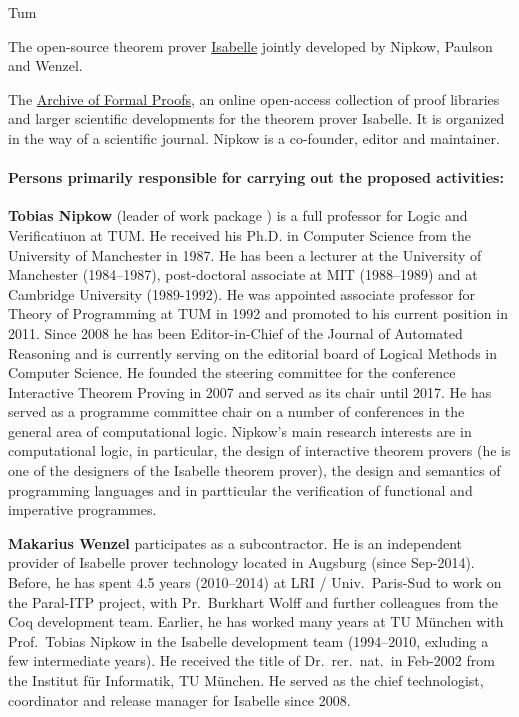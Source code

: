 \begin{sitedescription}{Tum}
\begin{compactitem}
\item The open-source theorem prover
  \href{https://isabelle.in.tum.de}{Isabelle} jointly developed by
  Nipkow, Paulson and Wenzel.
\item The \href{http://www.isa-afp.org}{Archive of Formal Proofs}, an online
open-access collection of proof libraries and larger scientific
developments for the theorem prover Isabelle. It is organized in the
way of a scientific journal.  Nipkow is a co-founder, editor and maintainer.
\end{compactitem}

\paragraph*{Persons primarily responsible for carrying out the proposed activities:}

\begin{compactitem}
\item \textbf{Tobias Nipkow} (leader of work package
) is a full professor for Logic and
Verificatiuon at TUM. He received his Ph.D. in Computer Science
from the University of Manchester in 1987.  He has been a
lecturer at the University of Manchester (1984--1987),
post-doctoral associate at MIT (1988--1989) and at Cambridge
University (1989-1992). He was appointed associate professor for Theory of Programming at
TUM in 1992 and promoted to his current position in 2011. Since 2008
he has been Editor-in-Chief of the  Journal of Automated Reasoning
and is currently serving on the editorial board of Logical Methods in
Computer Science. He founded the steering committee for the
conference Interactive Theorem Proving in 2007 and served as its
chair until 2017.
He has served as a programme committee chair
on a number of conferences in the general area of computational logic.  Nipkow's main research
interests are in computational logic, in particular, the design of
interactive theorem provers (he is one of the designers of the
Isabelle theorem prover), the design and semantics of programming
languages and in partticular the verification of functional and
imperative programmes.

\item \textbf{Makarius Wenzel} participates as a subcontractor. He is an independent provider of Isabelle
  prover technology located in Augsburg (since Sep-2014). Before, he
  has spent 4.5 years (2010--2014) at LRI / Univ.\ Paris-Sud to work on
  the Paral-ITP project, with Pr.~Burkhart Wolff and further
  colleagues from the Coq development team. Earlier, he has worked
  many years at TU München with Prof.\ Tobias Nipkow in the Isabelle
  development team (1994--2010, exluding a few intermediate years). He
  received the title of Dr.~rer.~nat.\ in Feb-2002 from the Institut
  für Informatik, TU München. He served as the chief technologist,
  coordinator and release manager for Isabelle since 2008.
\end{compactitem}

\end{sitedescription}

